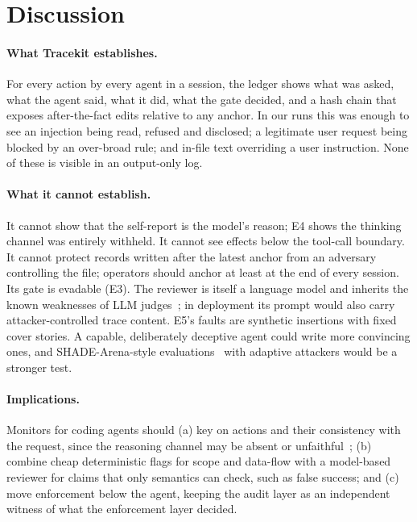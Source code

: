 \documentclass[11pt]{article}
\begin{document}
\section{Discussion}\label{sec:discussion}
\paragraph{What Tracekit establishes.} For every action by every agent in a session, the ledger shows what was asked, what the agent said, what it did, what the gate decided, and a hash chain that exposes after-the-fact edits relative to any anchor. In our runs this was enough to see an injection being read, refused and disclosed; a legitimate user request being blocked by an over-broad rule; and in-file text overriding a user instruction. None of these is visible in an output-only log.

\paragraph{What it cannot establish.} It cannot show that the self-report is the model's reason; E4 shows the thinking channel was entirely withheld. It cannot see effects below the tool-call boundary. It cannot protect records written after the latest anchor from an adversary controlling the file; operators should anchor at least at the end of every session. Its gate is evadable (E3). The reviewer is itself a language model and inherits the known weaknesses of LLM judges~\cite{zheng2023judging}; in deployment its prompt would also carry attacker-controlled trace content. E5's faults are synthetic insertions with fixed cover stories. A capable, deliberately deceptive agent could write more convincing ones, and SHADE-Arena-style evaluations~\cite{kutasov2025shade} with adaptive attackers would be a stronger test.

\paragraph{Implications.} Monitors for coding agents should (a) key on actions and their consistency with the request, since the reasoning channel may be absent or unfaithful~\cite{chen2025reasoning,korbak2025cot}; (b) combine cheap deterministic flags for scope and data-flow with a model-based reviewer for claims that only semantics can check, such as false success; and (c) move enforcement below the agent, keeping the audit layer as an independent witness of what the enforcement layer decided.
\end{document}
